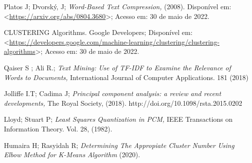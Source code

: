 \documentclass[
	12pt,					%
	openright,				%
	twoside,					%
	a4paper,					%
	english,					%
	brazil					%
	]{abntex2}
\begin{document}
\begin{thebibliography}{9}
 Platos J; Dvorský, J;
\emph{Word-Based Text Compression, } (2008).
Disponível em: <\url{https://arxiv.org/abs/0804.3680}>;
Acesso em: 30 de maio de 2022.

CLUSTERING Algorithms.
Google Developers; 
Disponível em:  <\url{https://developers.google.com/machine-learning/clustering/clustering-algorithms}>; Acesso em: 30 de maio de 2022.

 Qaiser S ; Ali R.; 
\emph{Text Mining: Use of TF-IDF to Examine the Relevance of Words to Documents, } International Journal of Computer Applications. 181 (2018)

 Jolliffe I.T; Cadima J;
\emph{Principal component analysis: a review and recent developments, } The Royal Society, (2018).
http://doi.org/10.1098/rsta.2015.0202

 Lloyd; Stuart P;
\emph{Least Squares Quantization in PCM, } IEEE Transactions on Information Theory. Vol. 28, (1982).

 Humaira H; Rasyidah R;
\emph{Determining The Appropiate Cluster Number Using Elbow Method for K-Means Algorithm} (2020). 

 
\end{thebibliography}

	
% 

% 

\end{document}
